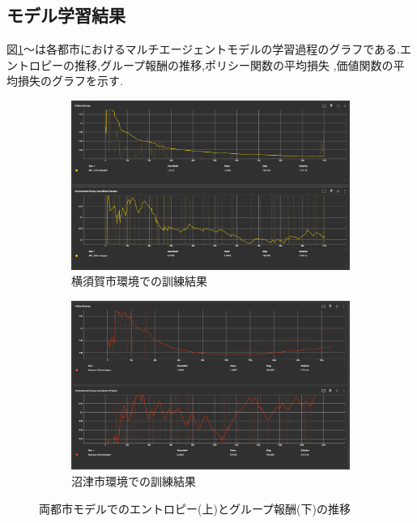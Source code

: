 \subsection{モデル学習結果}
図\ref{fig:YokosukaModel-Result}～は各都市におけるマルチエージェントモデルの学習過程のグラフである.エントロピーの推移,グループ報酬の推移,ポリシー関数の平均損失
,価値関数の平均損失のグラフを示す.
\begin{figure}[H]
  \centering
  \begin{subfigure}{0.45\textwidth}
      \centering
      \includegraphics[width=\textwidth]{Figures/YokosukaModel-Result.png}
      \caption{横須賀市環境での訓練結果}
      \label{fig:YokosukaModel-Result}
  \end{subfigure}
  \begin{subfigure}{0.45\textwidth}
      \centering
      \includegraphics[width=\textwidth]{Figures/NumazuModel-Result.png}
      \caption{沼津市環境での訓練結果}
      \label{fig:NumazuModel-Result}
  \end{subfigure}
  \caption{両都市モデルでのエントロピー(上)とグループ報酬(下)の推移}
  \label{fig:Model-Result1}
\end{figure}
